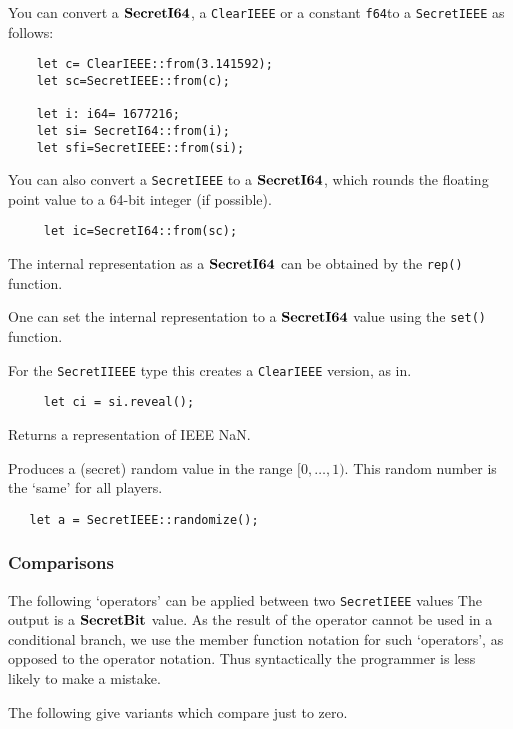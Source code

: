You can convert a $\mathbf{SecretI64}$, a \verb|ClearIEEE| or a constant
\verb|f64|to a \verb|SecretIEEE|
as follows:
\begin{lstlisting}
    let c= ClearIEEE::from(3.141592);
    let sc=SecretIEEE::from(c);

    let i: i64= 1677216;
    let si= SecretI64::from(i);
    let sfi=SecretIEEE::from(si);
\end{lstlisting}
You can also convert a  \verb|SecretIEEE| to a $\mathbf{SecretI64}$, which rounds the
floating point value to a 64-bit integer (if possible).
\begin{lstlisting}
     let ic=SecretI64::from(sc);
\end{lstlisting}


The internal representation as a $\mathbf{SecretI64}$ can be obtained by the
\verb|rep()| function.

One can set the internal representation to a $\mathbf{SecretI64}$ value using
the \verb|set()| function.

For the \verb|SecretIIEEE| type this creates a \verb|ClearIEEE| version, as in.
\begin{lstlisting}
     let ci = si.reveal();
\end{lstlisting}

Returns a representation of IEEE NaN.

Produces a (secret) random value in the range $[0,\ldots,1)$.
This random number is the `same' for all players.
\begin{lstlisting}
   let a = SecretIEEE::randomize();
\end{lstlisting}


\subsubsection{Comparisons}
The following `operators' can be applied between two \verb|SecretIEEE| values
The output is a $\mathbf{SecretBit}$ value.
As the result of the operator cannot be used in a conditional branch,
we use the member function notation for such `operators', as opposed
to the operator notation. Thus syntactically the programmer is less
likely to make a mistake.

\noindent
The following give variants which compare just to zero.


